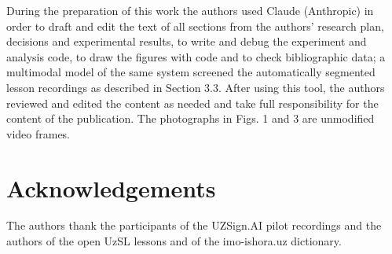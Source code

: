 During the preparation of this work the authors used Claude (Anthropic) \citep{2026_anthropic_claude} in order to draft and edit the text of all sections from the authors' research plan, decisions and experimental results, to write and debug the experiment and analysis code, to draw the figures with code and to check bibliographic data; a multimodal model of the same system screened the automatically segmented lesson recordings as described in Section 3.3. After using this tool, the authors reviewed and edited the content as needed and take full responsibility for the content of the publication. The photographs in Figs. 1 and 3 are unmodified video frames.

\hypertarget{acknowledgements}{%
\section{Acknowledgements}\label{acknowledgements}}

The authors thank the participants of the UZSign.AI pilot recordings and the authors of the open UzSL lessons and of the imo-ishora.uz dictionary.
